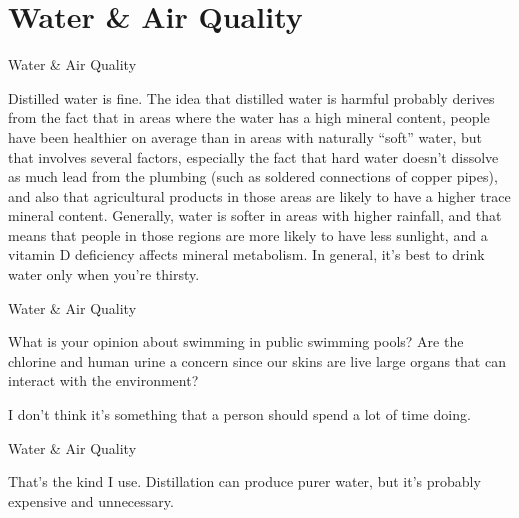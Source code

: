 \documentclass[11pt,oneside,openany,extrafontsizes]{memoir}
\begin{document}
\section{Water \& Air Quality}

\begin{standalonequote}{Water \& Air Quality}

    \begin{answer}
        Distilled water is fine. The idea that distilled water is harmful probably derives from the fact that in areas where the water has a high mineral content, people have been healthier on average than in areas with naturally \enquote{soft} water, but that involves several factors, especially the fact that hard water doesn't dissolve as much lead from the plumbing (such as soldered connections of copper pipes), and also that agricultural products in those areas are likely to have a higher trace mineral content. Generally, water is softer in areas with higher rainfall, and that means that people in those regions are more likely to have less sunlight, and a vitamin D deficiency affects mineral metabolism. In general, it's best to drink water only when you're thirsty.
    \end{answer}
\end{standalonequote}

\begin{qaexchange}{Water \& Air Quality}

    \begin{question}
        What is your opinion about swimming in public swimming pools? Are the chlorine and human urine a concern since our skins are live large organs that can interact with the environment?
    \end{question}

    \begin{answer}
       I don't think it's something that a person should spend a lot of time doing. 
    \end{answer}
\end{qaexchange}

\begin{standalonequote}{Water \& Air Quality}

    \begin{answer}
      That's the kind I use. Distillation can produce purer water, but it's probably expensive and unnecessary.
    \end{answer}
\end{standalonequote}
\end{document}
